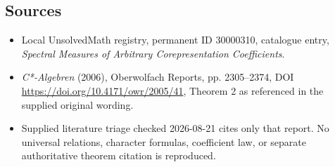 \documentclass[11pt]{article}
\begin{document}
\subsection{Sources}
\begin{itemize}
\item Local UnsolvedMath registry, permanent ID 30000310, catalogue entry, \emph{Spectral Measures of Arbitrary Corepresentation Coefficients}.
\item \emph{C*-Algebren} (2006), Oberwolfach Reports, pp. 2305--2374, DOI \url{https://doi.org/10.4171/owr/2005/41}, Theorem 2 as referenced in the supplied original wording.
\item Supplied literature triage checked 2026-08-21 cites only that report. No universal relations, character formulas, coefficient law, or separate authoritative theorem citation is reproduced.
\end{itemize}
\end{document}
